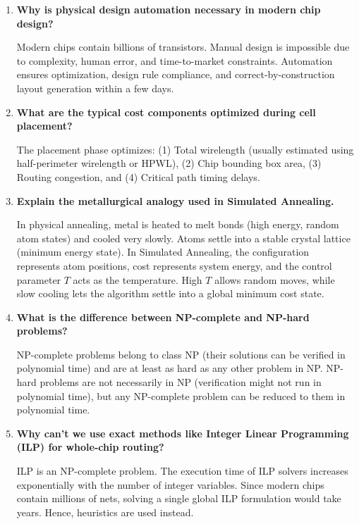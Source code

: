 \documentclass[12pt,a4paper]{article}
\newcommand{\Q}[1]{\textbf{#1}\par\noindent\ignorespaces}
\begin{document}
\begin{tcolorbox}[exambox, title={\textbf{Frequently Asked / Viva Questions}}]
\begin{enumerate}[leftmargin=*, topsep=0pt, label=\textbf{Q\arabic*.}, itemsep=6pt]
  \item \Q{Why is physical design automation necessary in modern chip design?}
        Modern chips contain billions of transistors. Manual design is impossible due to complexity, human error, and time-to-market constraints. Automation ensures optimization, design rule compliance, and correct-by-construction layout generation within a few days.
        
  \item \Q{What are the typical cost components optimized during cell placement?}
        The placement phase optimizes: (1) Total wirelength (usually estimated using half-perimeter wirelength or HPWL), (2) Chip bounding box area, (3) Routing congestion, and (4) Critical path timing delays.
        
  \item \Q{Explain the metallurgical analogy used in Simulated Annealing.}
        In physical annealing, metal is heated to melt bonds (high energy, random atom states) and cooled very slowly. Atoms settle into a stable crystal lattice (minimum energy state). In Simulated Annealing, the configuration represents atom positions, cost represents system energy, and the control parameter $T$ acts as the temperature. High $T$ allows random moves, while slow cooling lets the algorithm settle into a global minimum cost state.
        
  \item \Q{What is the difference between NP-complete and NP-hard problems?}
        NP-complete problems belong to class NP (their solutions can be verified in polynomial time) and are at least as hard as any other problem in NP. NP-hard problems are not necessarily in NP (verification might not run in polynomial time), but any NP-complete problem can be reduced to them in polynomial time.
        
  \item \Q{Why can't we use exact methods like Integer Linear Programming (ILP) for whole-chip routing?}
        ILP is an NP-complete problem. The execution time of ILP solvers increases exponentially with the number of integer variables. Since modern chips contain millions of nets, solving a single global ILP formulation would take years. Hence, heuristics are used instead.
        

\end{enumerate}
\end{tcolorbox}
\end{document}
